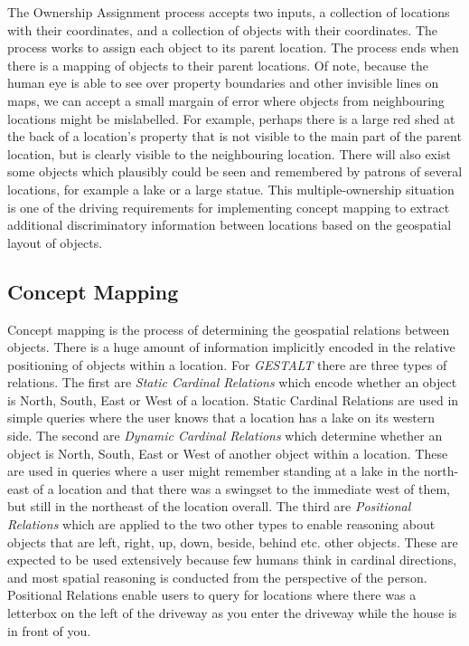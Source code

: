 The Ownership Assignment process accepts two inputs, a collection of locations with their coordinates, and a collection of objects with their coordinates. 
The process works to assign each object to its parent location. 
The process ends when there is a mapping of objects to their parent locations. Of note, because the human eye is able to see over property boundaries and other invisible lines on maps, we can accept a small margain of error where objects from neighbouring locations might be mislabelled. For example, perhaps there is a large red shed at the back of a location's property that is not visible to the main part of the parent location, but is clearly visible to the neighbouring location.
There will also exist some objects which plausibly could be seen and remembered by patrons of several locations, for example a lake or a large statue. 
This multiple-ownership situation is one of the driving requirements for implementing concept mapping to extract additional discriminatory information between locations based on the geospatial layout of objects. 

\subsection{Concept Mapping}
Concept mapping is the process of determining the geospatial relations between objects. There is a huge amount of information implicitly encoded in the relative positioning of objects within a location. For \textit{GESTALT} there are three types of relations. 
The first are \textit{Static Cardinal Relations} which encode whether an object is North, South, East or West of a location. Static Cardinal Relations are used in simple queries where the user knows that a location has a lake on its western side. 
The second are \textit{Dynamic Cardinal Relations} which determine whether an object is North, South, East or West of another object within a location. These are used in queries where a user might remember standing at a lake in the north-east of a location and that there was a swingset to the immediate west of them, but still in the northeast of the location overall. 
The third are \textit{Positional Relations} which are applied to the two other types to enable reasoning about objects that are left, right, up, down, beside, behind etc. other objects. 
These are expected to be used extensively because few humans think in cardinal directions, and most spatial reasoning is conducted from the perspective of the person. 
Positional Relations enable users to query for locations where there was a letterbox on the left of the driveway as you enter the driveway while the house is in front of you. 


